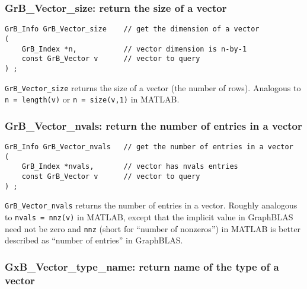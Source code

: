 \documentclass[12pt]{article}
\begin{document}
{\newpage
\subsubsection{{\sf GrB\_Vector\_size:}          return the size of a vector}
\label{vector_size}

\begin{mdframed}[userdefinedwidth=6in]
{\footnotesize
\begin{verbatim}
GrB_Info GrB_Vector_size    // get the dimension of a vector
(
    GrB_Index *n,           // vector dimension is n-by-1
    const GrB_Vector v      // vector to query
) ;
\end{verbatim}
} \end{mdframed}

\verb'GrB_Vector_size' returns the size of a vector (the number of rows).
Analogous to \verb'n = length(v)' or \verb'n = size(v,1)' in MATLAB.

\subsubsection{{\sf GrB\_Vector\_nvals:}         return the number of entries in a vector}
\label{vector_nvals}

\begin{mdframed}[userdefinedwidth=6in]
{\footnotesize
\begin{verbatim}
GrB_Info GrB_Vector_nvals   // get the number of entries in a vector
(
    GrB_Index *nvals,       // vector has nvals entries
    const GrB_Vector v      // vector to query
) ;
\end{verbatim}
} \end{mdframed}

\verb'GrB_Vector_nvals' returns the number of entries in a vector.  Roughly
analogous to \verb'nvals = nnz(v)' in MATLAB, except that the implicit value in
GraphBLAS need not be zero and \verb'nnz' (short for ``number of nonzeros'') in
MATLAB is better described as ``number of entries'' in GraphBLAS.

\subsubsection{{\sf GxB\_Vector\_type\_name:} return name of the type of a vector}
\label{vector_type_name}

}
\end{document}
